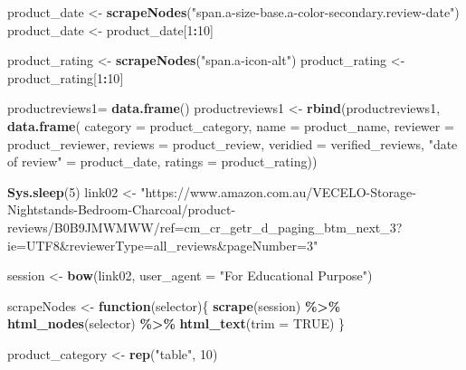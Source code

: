 \documentclass[
]{article}
\newenvironment{Shaded}{\begin{snugshade}}{\end{snugshade}}
\newcommand{\AttributeTok}[1]{\textcolor[rgb]{0.13,0.29,0.53}{#1}}
\newcommand{\ConstantTok}[1]{\textcolor[rgb]{0.56,0.35,0.01}{#1}}
\newcommand{\ControlFlowTok}[1]{\textcolor[rgb]{0.13,0.29,0.53}{\textbf{#1}}}
\newcommand{\DecValTok}[1]{\textcolor[rgb]{0.00,0.00,0.81}{#1}}
\newcommand{\FunctionTok}[1]{\textcolor[rgb]{0.13,0.29,0.53}{\textbf{#1}}}
\newcommand{\NormalTok}[1]{#1}
\newcommand{\OtherTok}[1]{\textcolor[rgb]{0.56,0.35,0.01}{#1}}
\newcommand{\SpecialCharTok}[1]{\textcolor[rgb]{0.81,0.36,0.00}{\textbf{#1}}}
\newcommand{\StringTok}[1]{\textcolor[rgb]{0.31,0.60,0.02}{#1}}
\begin{document}
\begin{Shaded}
\begin{Highlighting}[]
\NormalTok{  product\_date }\OtherTok{\textless{}{-}} \FunctionTok{scrapeNodes}\NormalTok{(}\StringTok{"span.a{-}size{-}base.a{-}color{-}secondary.review{-}date"}\NormalTok{)}
\NormalTok{  product\_date }\OtherTok{\textless{}{-}}\NormalTok{ product\_date[}\DecValTok{1}\SpecialCharTok{:}\DecValTok{10}\NormalTok{]}
  
\NormalTok{  product\_rating }\OtherTok{\textless{}{-}} \FunctionTok{scrapeNodes}\NormalTok{(}\StringTok{"span.a{-}icon{-}alt"}\NormalTok{)}
\NormalTok{  product\_rating }\OtherTok{\textless{}{-}}\NormalTok{ product\_rating[}\DecValTok{1}\SpecialCharTok{:}\DecValTok{10}\NormalTok{]}
  
\NormalTok{  productreviews1}\OtherTok{=} \FunctionTok{data.frame}\NormalTok{()}
\NormalTok{  productreviews1 }\OtherTok{\textless{}{-}} \FunctionTok{rbind}\NormalTok{(productreviews1, }\FunctionTok{data.frame}\NormalTok{(}
                      \AttributeTok{category =}\NormalTok{ product\_category,}
                      \AttributeTok{name =}\NormalTok{ product\_name,}
                      \AttributeTok{reviewer =}\NormalTok{ product\_reviewer,}
                      \AttributeTok{reviews =}\NormalTok{ product\_review,}
                      \AttributeTok{veridied =}\NormalTok{ verified\_reviews,}
                      \StringTok{"date of review"} \OtherTok{=}\NormalTok{ product\_date,}
                      \AttributeTok{ratings =}\NormalTok{ product\_rating))}

  
 \FunctionTok{Sys.sleep}\NormalTok{(}\DecValTok{5}\NormalTok{)}
\NormalTok{link02 }\OtherTok{\textless{}{-}} \StringTok{"https://www.amazon.com.au/VECELO{-}Storage{-}Nightstands{-}Bedroom{-}Charcoal/product{-}reviews/B0B9JMWMWW/ref=cm\_cr\_getr\_d\_paging\_btm\_next\_3?ie=UTF8\&reviewerType=all\_reviews\&pageNumber=3"}


\NormalTok{  session }\OtherTok{\textless{}{-}} \FunctionTok{bow}\NormalTok{(link02,}
               \AttributeTok{user\_agent =} \StringTok{"For Educational Purpose"}\NormalTok{)}

\NormalTok{  scrapeNodes }\OtherTok{\textless{}{-}} \ControlFlowTok{function}\NormalTok{(selector)\{}
    \FunctionTok{scrape}\NormalTok{(session) }\SpecialCharTok{\%\textgreater{}\%}
      \FunctionTok{html\_nodes}\NormalTok{(selector) }\SpecialCharTok{\%\textgreater{}\%}
      \FunctionTok{html\_text}\NormalTok{(}\AttributeTok{trim =} \ConstantTok{TRUE}\NormalTok{)}
\NormalTok{  \}}

\NormalTok{  product\_category }\OtherTok{\textless{}{-}} \FunctionTok{rep}\NormalTok{(}\StringTok{"table"}\NormalTok{, }\DecValTok{10}\NormalTok{)}


\end{Highlighting}
\end{Shaded}
\end{document}
